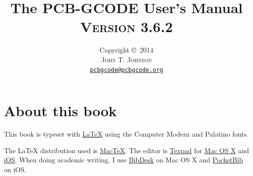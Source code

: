 \documentclass[11pt]{book}
\title{\vspace{-15mm}\fontsize{24pt}{10pt}\selectfont\textbf{The PCB-GCODE User's Manual}\\[1em]
\fontsize{18pt}{10pt}\textsc{Version 3.6.2}\\[1em]
}
\author{
\large
Copyright \copyright\ 2014\\[1em]
\textsc{John T. Johnson}\\[2mm] %
\normalsize \href{mailto:pcbgcode@pcbgcode.org}{\texttt{pcbgcode@pcbgcode.org}} %
\vspace{-5mm}
}
\begin{document}


\newcommand{\warning}[1]{
	\marginpar{
		\vspace{0.1in}
		\texttt{[image: /Users/john/Dropbox/Docs/warning.pdf]}
		\centering
		#1
	}
}

\newcommand{\information}[1]{
	\marginpar{
		\vspace{0.1in}
		\texttt{[image: /Users/john/Dropbox/Docs/information.pdf]}
		\centering
		#1
	}
}

\newcommand{\howitworks}[1]{
	\marginpar{
		\vspace{0.1in}
		\texttt{[image: /Users/john/Dropbox/Docs/gears.pdf]}
		\centering
		#1
	}
}


  
\setlength{\marginparwidth}{1.0in}
\setlength{\marginparsep}{1em}


\newcommand{\code}[1]{\texttt{#1}}



\frontmatter

\maketitle

%
%
\section*{About this book}

This book is typeset with \href{http://en.wikipedia.org/wiki/LaTeX}{\LaTeX{}} using the Computer Modern and Palatino fonts.
\vspace{1ex}

\noindent The \LaTeX{} distribution used is \href{http://tug.org/mactex/}{MacTeX}. The editor is \href{http://texpadapp.com}{Texpad} for \href{http://www.apple.com/osx/}{Mac OS X} and \href{http://www.apple.com/ios/}{iOS}. When doing academic writing, I use \href{http://bibdesk.sourceforge.net}{BibDesk} on Mac OS X and \href{https://itunes.apple.com/us/app/pocketbib-for-bibtex-bibdesk/id524521749?mt=8}{PocketBib} on iOS.
\vspace{1ex}
\end{document}

